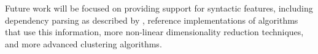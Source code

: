 Future work will be focused on providing support for syntactic features,
including dependency parsing as described by \cite{pado07dependency}, reference
implementations of algorithms that use this information, more non-linear
dimensionality reduction techniques, and more advanced clustering algorithms.





